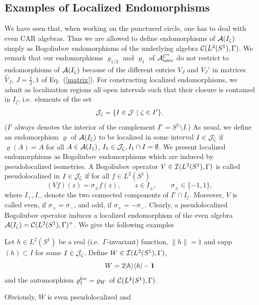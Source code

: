 \documentclass[10pt,a4paper]{article}
\begin{document}
\subsection{Examples of Localized Endomorphisms}
We have seen that, when working on the punctured
circle, one has to deal with even CAR algebras.
Thus we are allowed to define endomorphisms
of ${\cal A}(I_\zeta)$ simply as Bogoliubov
endomorphisms of the underlying algebra
${\cal C}(L^2(S^1),\Gamma)$. We remark that our
endomorphisms $\varrho_{1/2}$ and $\varrho_1$ of
${\cal A}_{\rm univ}^{C^*}$ do not restrict to
endomorphisms of ${\cal A}(I_\zeta)$ because of the
different entries $V_J$ and $V_J'$ in matrices
$\hat{V}_J$, $J=\frac{1}{2},1$ of Eq.~(\ref{matrix}).
For constructing localized endomorphisms,
we admit as localization
regions all open intervals such that their
closure is contained in $I_\zeta$, i.e.~elements
of the set
\begin{equation}
\label{Izeta}
{\cal J}_\zeta = \{ I\in {\cal J}\,\,|\,\,
\zeta\in I' \}.
\end{equation}
($I'$ always denotes the interior of the
complement $I^c=S^1\setminus I$.)
As usual, we define an endomorphism $\varrho$ of
${\cal A}(I_\zeta)$ to be localized in some
interval $I\in{\cal J}_\zeta$ if $\varrho(A)=A$
for all $A\in{\cal A}(I_1)$, $I_1\in{\cal J}_\zeta,
I_1\cap I=\emptyset$. We present localized
endomorphisms as Bogoliubov endomorphisms which
are induced by pseudolocalized isometries.
A Bogoliubov operator
$V\in{\cal I}(L^2(S^1),\Gamma)$ is called
pseudolocalized in $I\in{\cal J}_\zeta$ if for all
$f\in L^2(S^1)$
\[ (Vf)(z)=\sigma_\pm f(z),\qquad z\in I_\pm,
\qquad \sigma_\pm \in \{-1,1\}, \]
where $I_+,I_-$ denote the two connected components
of $I'\cap I_\zeta$. Moreover, $V$ is called even,
if $\sigma_+=\sigma_-$, and odd, if $\sigma_+=
-\sigma_-$. Clearly, a pseudolocalized Bogoliubov
operator induces a localized endomorphism of the
even algebra ${\cal A}(I_\zeta)=
{\cal C}(L^2(S^1),\Gamma)^+$. We give the following
examples
\begin{definition}
\label{rho1loc}
Let $h\in L^2(S^1)$ be a real
(i.e.~$\Gamma$-invariant) function, $\|h\|=1$ and
{\rm supp}$(h)\subset I$ for some $I\in{\cal J}_\zeta$.
Define $W\in{\cal I}(L^2(S^1),\Gamma)$,
\begin{equation}
W= 2|h\rangle\langle h|-{\bf 1}
\end{equation}
and the automorphism $\varrho_1^{\rm loc}=\varrho_W$
of ${\cal C}(L^2(S^1),\Gamma)$.
\end{definition}
Obviously, $W$ is even pseudolocalized and
\end{document}
